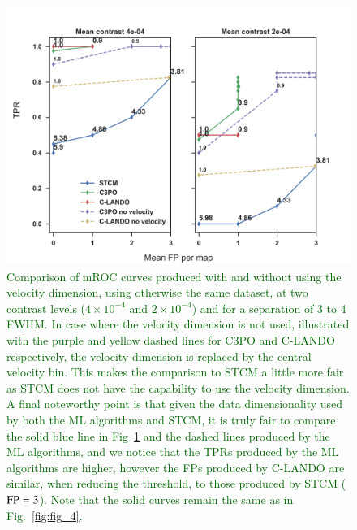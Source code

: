 \documentclass[referee]{aa} %
\newcommand{\newchange}[1]{\textcolor{darkgreen}{#1}}
\begin{document}
\begin{figure}
    \centering
    \includegraphics[width=\textwidth]{Fig6_April2024_referee_final.png}
    \caption{\newchange{Comparison of mROC curves produced with and without using the velocity dimension, using otherwise the same dataset, at two contrast levels ($4\times 10^{-4}$ and $2\times 10^{-4}$) and for a separation of 3 to 4 FWHM. In case where the velocity dimension is not used, illustrated with the purple and yellow dashed lines for C3PO and C-LANDO respectively, the velocity dimension is replaced by the central velocity bin. This makes the comparison to STCM a little more fair as STCM does not have the capability to use the velocity dimension.
A final noteworthy point is that given the data dimensionality used by both the ML algorithms and STCM, it is truly fair to compare the solid blue line in Fig~\ref{fig:novel_roc} and the dashed lines produced by the ML algorithms, and we notice that the TPRs produced by the ML algorithms are higher, however the FPs produced by C-LANDO are similar, when reducing the threshold, to those produced by STCM (${\rm FP}=3$). 
    Note that the solid curves remain the same as in Fig.~\ref{fig:fig_4}.}
    }
    \label{fig:novel_roc}
\end{figure}
\end{document}

